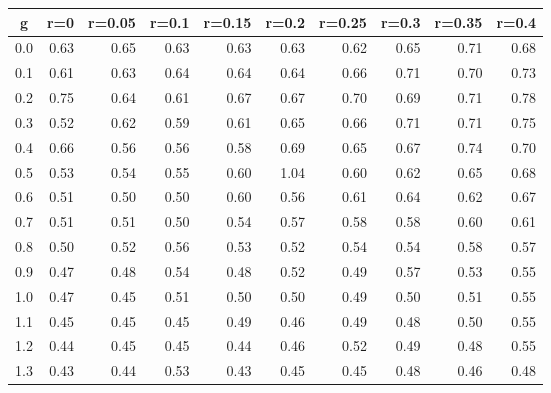 %
\begin{table}[!tbp]
 \begin{center}
 \begin{tabular}{rrrrrrrrrr}\hline\hline
\multicolumn{1}{c}{g}&\multicolumn{1}{c}{r=0}&\multicolumn{1}{c}{r=0.05}&\multicolumn{1}{c}{r=0.1}&\multicolumn{1}{c}{r=0.15}&\multicolumn{1}{c}{r=0.2}&\multicolumn{1}{c}{r=0.25}&\multicolumn{1}{c}{r=0.3}&\multicolumn{1}{c}{r=0.35}&\multicolumn{1}{c}{r=0.4}\tabularnewline
\hline
0.0&0.63&0.65&0.63&0.63&0.63&0.62&0.65&0.71&0.68\tabularnewline
0.1&0.61&0.63&0.64&0.64&0.64&0.66&0.71&0.70&0.73\tabularnewline
0.2&0.75&0.64&0.61&0.67&0.67&0.70&0.69&0.71&0.78\tabularnewline
0.3&0.52&0.62&0.59&0.61&0.65&0.66&0.71&0.71&0.75\tabularnewline
0.4&0.66&0.56&0.56&0.58&0.69&0.65&0.67&0.74&0.70\tabularnewline
0.5&0.53&0.54&0.55&0.60&1.04&0.60&0.62&0.65&0.68\tabularnewline
0.6&0.51&0.50&0.50&0.60&0.56&0.61&0.64&0.62&0.67\tabularnewline
0.7&0.51&0.51&0.50&0.54&0.57&0.58&0.58&0.60&0.61\tabularnewline
0.8&0.50&0.52&0.56&0.53&0.52&0.54&0.54&0.58&0.57\tabularnewline
0.9&0.47&0.48&0.54&0.48&0.52&0.49&0.57&0.53&0.55\tabularnewline
1.0&0.47&0.45&0.51&0.50&0.50&0.49&0.50&0.51&0.55\tabularnewline
1.1&0.45&0.45&0.45&0.49&0.46&0.49&0.48&0.50&0.55\tabularnewline
1.2&0.44&0.45&0.45&0.44&0.46&0.52&0.49&0.48&0.55\tabularnewline
1.3&0.43&0.44&0.53&0.43&0.45&0.45&0.48&0.46&0.48\tabularnewline
\hline
\end{tabular}

\end{center}

\end{table}

